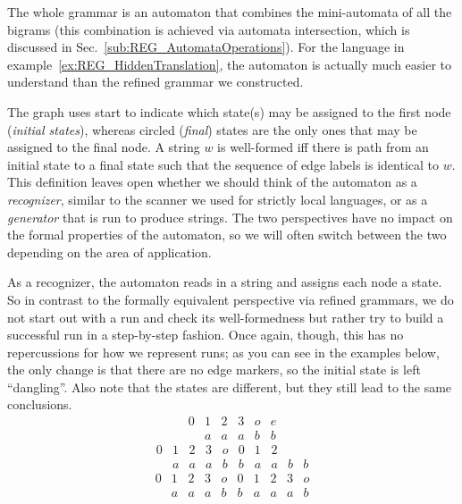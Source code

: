The whole grammar is an automaton that combines the mini-automata of all the bigrams (this combination is achieved via automata intersection, which is discussed in Sec.~\ref{sub:REG_AutomataOperations}).
For the language in example~\ref{ex:REG_HiddenTranslation}, the automaton is actually much easier to understand than the refined grammar we constructed. 
%
\begin{center}
    
\end{center}
%
The graph uses start to indicate which state(s) may be assigned to the first node (\emph{initial states}), whereas circled (\emph{final}) states are the only ones that may be assigned to the final node.
A string $w$ is well-formed iff there is path from an initial state to a final state such that the sequence of edge labels is identical to $w$.
This definition leaves open whether we should think of the automaton as a \emph{recognizer}, similar to the scanner we used for strictly local languages, or as a \emph{generator} that is run to produce strings.
The two perspectives have no impact on the formal properties of the automaton, so we will often switch between the two depending on the area of application.

As a recognizer, the automaton reads in a string and assigns each node a state.
So in contrast to the formally equivalent perspective via refined grammars, we do not start out with a run and check its well-formedness but rather try to build a successful run in a step-by-step fashion.
Once again, though, this has no repercussions for how we represent runs;
as you can see in the examples below, the only change is that there are no edge markers, so the initial state is left ``dangling''.
Also note that the states are different, but they still lead to the same conclusions.
%
\[
    \begin{array}{cccccc}
            0 & 1 & 2 & 3 & o & e\\
              & a & a & a & b & b 
    \end{array}
\]
\[ 
    \begin{array}{cccccccccc}
            0 & 1 & 2 & 3 & o & 0 & 1 & 2 & &\\
              & a & a & a & b & b & a & a & b & b 
    \end{array}
\]
\[ 
    \begin{array}{cccccccccc}
            0 & 1 & 2 & 3 & o & 0 & 1 & 2 & 3 & o\\
              & a & a & a & b & b & a & a & a & b 
    \end{array}
\]

